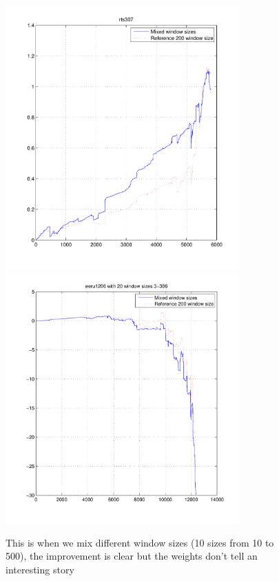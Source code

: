 \documentclass[envcountsame]{llncs}
\begin{document}
\begin{figure}
\centering
\includegraphics[width=0.8\textwidth]{images/mixed_regionsizes}
\includegraphics[width=0.8\textwidth]{images/mixed_regionsizes_eeru1206}
\caption{This is when we mix different window sizes (10 sizes from 10 to 500), the improvement is clear but the weights don't tell an interesting story}
\label{fig:mixregionsize}
\end{figure}
\end{document}
